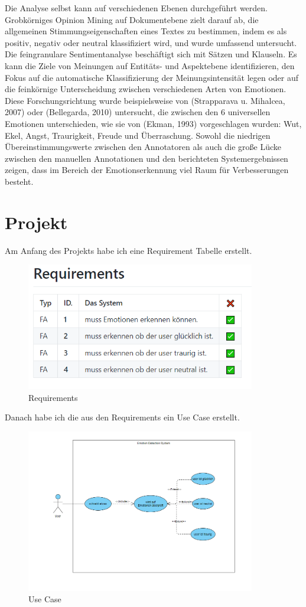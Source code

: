 \documentclass[conference]{IEEEtran}
\begin{document}
Die Analyse selbst kann auf verschiedenen Ebenen durchgeführt werden. Grobkörniges Opinion Mining auf Dokumentebene zielt darauf ab, die allgemeinen Stimmungseigenschaften eines Textes zu bestimmen, indem es als positiv, negativ oder neutral klassifiziert wird, und wurde umfassend untersucht. Die feingranulare Sentimentanalyse beschäftigt sich mit Sätzen und Klauseln. Es kann die Ziele von Meinungen auf Entitäts- und Aspektebene identifizieren, den Fokus auf die automatische Klassifizierung der Meinungsintensität legen oder auf die feinkörnige Unterscheidung zwischen verschiedenen Arten von Emotionen. Diese Forschungsrichtung wurde beispielsweise von (Strapparava u. Mihalcea, 2007) oder (Bellegarda, 2010) untersucht, die zwischen den 6 universellen Emotionen unterschieden, wie sie von (Ekman, 1993) vorgeschlagen wurden: Wut, Ekel, Angst, Traurigkeit, Freude und Überraschung. Sowohl die niedrigen Übereinstimmungswerte zwischen den Annotatoren als auch die große Lücke zwischen den manuellen Annotationen und den berichteten Systemergebnissen zeigen, dass im Bereich der Emotionserkennung viel Raum für Verbesserungen besteht.\cite{b4}

\section{Projekt}
Am Anfang des Projekts habe ich eine Requirement Tabelle erstellt.
\begin{figure}[h]
	\centering
	\includegraphics[width=10cm]{Requirements}
	\caption{Requirements}
\end{figure}

Danach habe ich die aus den Requirements ein Use Case erstellt.
\begin{figure}[h]
	\centering
	\includegraphics[width=10cm]{UseCase}
	\caption{Use Case}
\end{figure}
\end{document}

